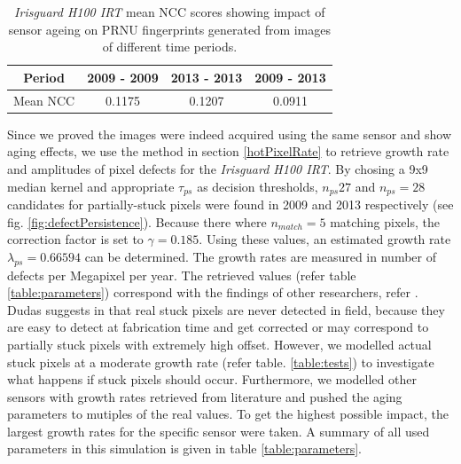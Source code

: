 \documentclass[10pt,twocolumn,letterpaper]{article}
\begin{document}
 \begin{table} [hbt]
 \begin{center}
	\begin{tabular}{ c | c | c | c }
		   Period & 2009 - 2009 & 2013 - 2013 & 2009 - 2013 \\
		  \hline
			Mean NCC & 0.1175 & 0.1207  & 0.0911 
	\end{tabular}
	\vspace{2mm}
        \caption{\emph{Irisguard H100 IRT} mean NCC scores showing impact of sensor ageing on PRNU fingerprints generated from images of different time periods.}
    \label{table:prnu_fp_corr}
\end{center} 
\end{table}

\vspace{-4mm}

Since we proved the images were indeed acquired using the same sensor and show aging effects, we use the method in section \ref{hotPixelRate} to retrieve growth rate and amplitudes of pixel defects for the \emph{Irisguard H100 IRT}. By chosing a 9x9 median kernel and appropriate $\tau_{ps}$ as decision thresholds, $n_{ps}27$ and $n_{ps}=28$ candidates for partially-stuck pixels were found in 2009 and 2013 respectively (see fig. \ref{fig:defectPersistence}). Because there where $n_{match}=5$ matching pixels, the correction factor is set to $\gamma=0.185$. Using these values, an estimated growth rate $\lambda_{ps}=0.66594$ can be determined. The growth rates are measured in number of defects per Megapixel per year. The retrieved values (refer table \ref{table:parameters}) correspond with the findings of other researchers, refer \cite{defectDetection, leung}. Dudas suggests in \cite{inFieldDefects} that real stuck pixels are never detected in field, because they are easy to detect at fabrication time and get corrected or may correspond to partially stuck pixels with extremely high offset. However, we modelled actual stuck pixels at a moderate growth rate (refer table. \ref{table:tests}) to investigate what happens if stuck pixels should occur. Furthermore, we modelled other sensors with growth rates retrieved from literature and pushed the aging parameters to mutiples of the real values. To get the highest possible impact, the largest growth rates for the specific sensor were taken. A summary of all used parameters in this simulation is given in table \ref{table:parameters}.

\end{document}
